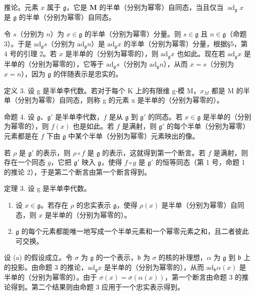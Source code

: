 推论。元素 \(x\) 属于 \(\mathfrak{g}\)，它是 \(\mathbf{M}\) 的半单（分别为幂零）自同态，当且仅当 \(\operatorname{ad}_{\mathfrak{g}} x\) 是 \(\mathfrak{g}\) 的半单（分别为幂零）自同态。

令 \(s\)（分别为 \(n\)）为 \(x \in \mathfrak{g}\) 的半单（分别为幂零）分量。则 \(s \in \mathfrak{g}\) 且 \(n \in \mathfrak{g}\)（命题 3）。于是 \(\mathrm{ad}_{\mathfrak{g}} s\)（分别为 \(\mathrm{ad}_{\mathfrak{g}} n\)）是 \(\mathrm{ad}_{\mathfrak{g}} x\) 的半单（分别为幂零）分量，根据§5，第 4 号的引理 2。若 \(x\) 是半单的（分别为幂零的），则 \(\mathrm{ad}_{\mathfrak{g}} x\) 也如此。现在若 \(\mathrm{ad}_{\mathfrak{g}} x\) 是半单的（分别为幂零的），它等于 \(\mathrm{ad}_{\mathfrak{g}} s\)（分别为 \(\mathrm{ad}_{\mathfrak{g}} n\)），从而 \(x = s\)（分别为 \(x = n\)），因为 \(\mathfrak{g}\) 的伴随表示是忠实的。

定义 3. 设 g 是半单李代数。若对于每个 K 上的有限维 g-模 M，\(x_{M}\) 都是 M 的半单（分别为幂零）自同态，则称 g 的元素 x 是半单的（分别为幂零的）。

命题 4. 设 \(\mathfrak{g}\)、\(\mathfrak{g}'\) 是半单李代数，\(f\) 是从 \(\mathfrak{g}\) 到 \(\mathfrak{g}'\) 的同态。若 \(x \in \mathfrak{g}\) 是半单的（分别为幂零的），则 \(f(x)\) 也是如此。若 \(f\) 是满射，则 \(\mathfrak{g}'\) 的每个半单（分别为幂零）元素都是在 \(f\) 下由 \(\mathfrak{g}\) 中某个半单（分别为幂零）元素映出的像。

若 \(\rho\) 是 \(\mathfrak{g}'\) 的表示，则 \(\rho \circ f\) 是 \(\mathfrak{g}\) 的表示，这就得到第一个断言。若 \(f\) 是满射，则存在一个同态 \(g\)，它把 \(\mathfrak{g}'\) 映入 \(\mathfrak{g}\)，使得 \(f \circ g\) 是 \(\mathfrak{g}'\) 的恒等同态（第 1 号，命题 1 的推论 2），于是第二个断言由第一个断言得到。

定理 3. 设 g 是半单李代数。

\begin{enumerate}
\def\labelenumi{(\alph{enumi})}
\item
  设 \(x \in \mathfrak{g}\)。若存在 \(\rho\) 的忠实表示 \(\mathfrak{g}\)，使得 \(\rho(x)\) 是半单（分别为幂零）自同态，则 \(x\) 是半单的（分别为幂零的）。
\item
  \(\mathfrak{g}\) 的每个元素都能唯一地写成一个半单元素和一个幂零元素之和，且二者彼此可交换。
\end{enumerate}

设 (a) 的假设成立。令 \(\sigma\) 为 \(\mathfrak{g}\) 的一个表示，\(\mathfrak{b}\) 为 \(\sigma\) 的核的补理想，\(\alpha\) 为 \(\mathfrak{g}\) 到 \(\mathfrak{b}\) 上的投影。由命题 3 的推论，\(\mathrm{ad}_{\mathfrak{g}}x\) 是半单的（分别为幂零的），从而 \(\mathrm{ad}_{\mathfrak{b}}\alpha(x)\) 是半单的（分别为幂零的）。由于 \(\sigma(x)=\sigma(\alpha(x))\)，第一个断言由命题 3 的推论得到。第二个结果则由命题 3 应用于一个忠实表示得到。

